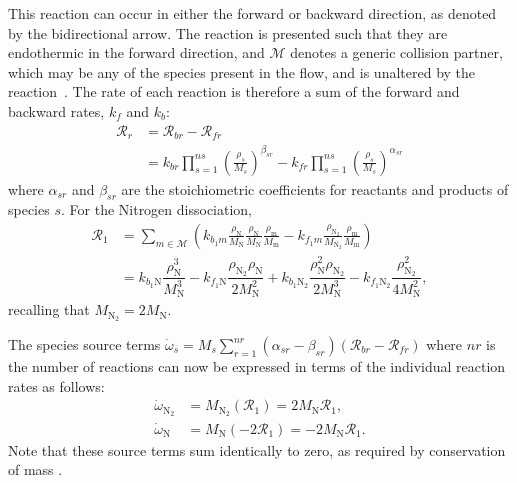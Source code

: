 \documentclass[10pt]{article}
\begin{document}
This reaction can occur in either the forward or backward direction, as denoted by the bidirectional arrow. The reaction is presented such that they are endothermic in the forward direction, and $\mathcal{M}$ denotes a generic collision partner, which may be any of the species present in the flow, and  is unaltered by the reaction~\citep{Kirk2009}.
The rate of each reaction is therefore a sum of the forward and backward rates,  $k_{f}$ and $k_{b}$:
\begin{equation*}
 \begin{split}
\mathcal{R}_r &=  \mathcal{R}_{br} - \mathcal{R}_{fr} \\
                &= k_{br} \prod_{s=1}^{ns} \left(\frac{\rho_s}{M_s}\right)^{\beta_{sr}} - k_{fr} \prod_{s=1}^{ns} \left(\frac{\rho_s}{M_s}\right)^{\alpha_{sr}}
 \end{split}
\end{equation*}
where $\alpha_{sr}$ and $\beta_{sr}$ are the stoichiometric coefficients for reactants and products of species $s$.
For the Nitrogen dissociation,
\begin{equation}
\begin{split}             	                
\label{eq:reaction1}
 \mathcal{R}_1 &= \sum_{m\in\mathcal{M}}\left(k_{b_1 m} \frac{\rho_{\text{N}}}{M_{\text{N}}}\frac{\rho_{\text{N}}}{M_{\text{N}}}\frac{\rho_{\text{m}}}{M_{\text{m}}} - k_{f_1 m}\frac{\rho_{\text{N}_2}}{M_{\text{N}_2}}\frac{\rho_{\text{m}}}{M_{\text{m}}} \right) \\
%
&= k_{b_1 \text{N}} \dfrac{\rho_{\text{N}}^3}{M_\text{N}^3} -
k_{f_1 \text{N}}   \dfrac{\rho_{\text{N}_2} \rho_{\text{N}}}{2  M_\text{N}^2}+
k_{b_1 \text{N}_2} \dfrac{\rho_\text{N}^2 \rho_{\text{N}_2}}{2M_\text{N}^3 }-
k_{f_1 \text{N}_2} \dfrac{\rho_{\text{N}_2}^2}{4 M_\text{N}^2},
\end{split}
\end{equation}
recalling that $M_{\text{N}_2}=2 M_\text{N}.$


The species source terms $\dot{\omega}_s = M_s \sum_{r=1}^{nr}\left(\alpha_{sr}-\beta_{sr}\right)\left(\mathcal{R}_{br} - \mathcal{R}_{fr}\right)$ 
 where $nr$ is the number of reactions can now be expressed in terms of the individual reaction rates as follows:
\begin{align*}
 \dot{\omega}_{\text{N}_2} &= M_{\text{N}_2}\left(\mathcal{R}_1\right)= 2 M_\text{N} \mathcal{R}_1 ,\\
 \dot{\omega}_{\text{N}} &= M_{\text{N}}\left(-2\mathcal{R}_1 \right)=-2 M_\text{N} \mathcal{R}_1. 
\end{align*}
Note that these source terms sum identically to zero, as required by conservation of mass \citep{Kessler2004}.
\end{document}
